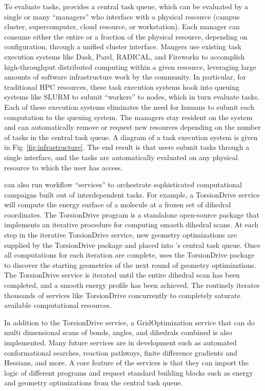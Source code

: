 \documentclass[journal=jctcce,manuscript=article]{achemso}
\newcommand{\qcfN}{QCFractal}
\newcommand{\qcf}{{\sc{\qcfN}}\xspace}%
\newcommand{\mqcas}{{\sc{mqcas}}\xspace}%
\begin{document}
To evaluate tasks, \qcf provides a central task queue, which can be evaluated by a single or many ``managers'' who interface with a physical resource (campus cluster, supercomputer, cloud resource, or workstation).
Each manager can consume either the entire or a fraction of the physical resource, depending on configuration, through a unified cluster interface.
Mangers use existing task execution systems like Dask\cite{matthew_rocklin-proc-scipy-2015}, Parsl\cite{babuji19parsl}, RADICAL\cite{10.1109/CCGRID.2018.00051}, and Fireworks\cite{CPE:CPE3505} to accomplish high-throughput distributed computing within a given resource, leveraging large amounts of software infrastructure work by the community.
In particular, for traditional HPC resources, these task execution systems hook into queuing systems like SLURM\cite{10.1007/10968987_3} to submit ``workers'' to nodes, which in turn evaluate tasks.
Each of these execution systems eliminates the need for humans to submit each computation to the queuing system.
The managers stay resident on the system and can automatically remove or request new resources depending on the number of tasks in the central task queue.
A diagram of a task execution system is given in Fig~\ref{fig:infrastructure}.
The end result is that users submit tasks through a single interface, and the tasks are automatically evaluated on any physical resource to which the user has access.

\qcf can also run workflow ``services'' to orchestrate sophisticated computational campaigns built out of interdependent tasks.
For example, a TorsionDrive\cite{torsiondrive} service will compute the energy surface of a molecule at a frozen set of dihedral coordinates.
The TorsionDrive program is a standalone open-source package\cite{WEB20:torsiondrive} that implements an iterative procedure for computing smooth dihedral scans.
At each step in the iterative TorsionDrive service, new geometry optimizations are supplied by the TorsionDrive package and placed into \qcf's central task queue.
Once all computations for each iteration are complete, \qcf uses the TorsionDrive package to discover the starting geometries of the next round of geometry optimizations.
The TorsionDrive service is iterated until the entire dihedral scan has been completed, and a smooth energy profile has been achieved.
The \mqcas routinely iterates thousands of services like TorsionDrive concurrently to completely saturate available computational resources.

In addition to the TorsionDrive service, a GridOptimization service that can do multi dimensional scans of bonds, angles, and dihedrals combined is also implemented.
Many future services are in development such as automated conformational searches, reaction pathways, finite difference gradients and Hessians, and more.
A core feature of the services is that they can import the logic of different programs and request standard building blocks such as energy and geometry optimizations from the central task queue.
\end{document}

